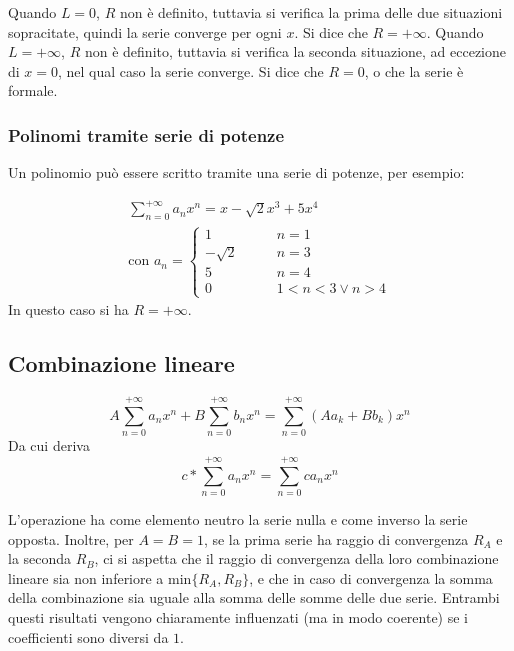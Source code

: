 Quando $L=0$, $R$ non è definito, tuttavia si verifica la prima delle due situazioni sopracitate, quindi la serie converge per ogni $x$. Si dice che $R=+\infty$. Quando $L=+\infty$, $R$ non è definito, tuttavia si verifica la seconda situazione, ad eccezione di $x=0$, nel qual caso la serie converge. Si dice che $R=0$, o che la serie è formale.

\subsubsection{Polinomi tramite serie di potenze}
Un polinomio può essere scritto tramite una serie di potenze, per esempio:
\begin{examp}
	\begin{gather*}
		\sum_{n=0}^{+\infty} a_n x^n= x-\sqrt2 x^3 + 5x^4\\
		\text{con }a_n=
		\begin{cases}
			1\qquad       & n=1           \\
			-\sqrt2\qquad & n=3           \\
			5\qquad       & n=4           \\
			0\qquad       & 1<n<3\lor n>4
		\end{cases}
	\end{gather*}
	In questo caso si ha $R=+\infty$.
\end{examp}


\subsection{Combinazione lineare}
\begin{defin}
	\label{ser:comblin}
	\begin{equation}
		A\sum_{n=0}^{+\infty}a_n x^n+B\sum_{n=0}^{+\infty} b_nx^n=\sum_{n=0}^{+\infty} (Aa_k+Bb_k)x^n
	\end{equation}
	Da cui deriva
	\begin{equation}
		\label{eq:cperserie}
		c*\sum_{n=0}^{+\infty} a_nx^n=\sum_{n=0}^{+\infty}ca_nx^n
	\end{equation}
\end{defin}
L'operazione ha come elemento neutro la serie nulla e come inverso la serie opposta. Inoltre, per $A=B=1$, se la prima serie ha raggio di convergenza $R_A$ e la seconda $R_B$, ci si aspetta che il raggio di convergenza della loro combinazione lineare sia non inferiore a $\text{min}\{R_A,R_B\}$, e che in caso di convergenza la somma della combinazione sia uguale alla somma delle somme delle due serie. Entrambi questi risultati vengono chiaramente influenzati (ma in modo coerente) se i coefficienti sono diversi da $1$.

